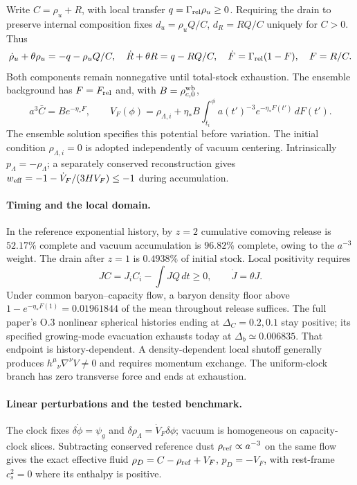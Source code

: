 \documentclass[11pt]{article}
\begin{document}
Write $C=\rho_u+R$, with local transfer $q=\Gamma_{\rm rel}\rho_u\ge0$. Requiring the drain to preserve internal composition fixes $d_u=\rho_uQ/C$, $d_R=RQ/C$ uniquely for $C>0$. Thus
\[
\dot\rho_u+\theta\rho_u=-q-\rho_uQ/C,\quad
\dot R+\theta R=q-RQ/C,\quad
\dot F=\Gamma_{\rm rel}(1-F),\quad F=R/C.
\]
Both components remain nonnegative until total-stock exhaustion. The ensemble background has $F=F_{\rm rel}$ and, with $B=\rho_{c,0}^{\rm wb}$,
\[
\boxed{a^3\bar C=B e^{-\eta_*F},\qquad
V_F(\phi)=\rho_{\Lambda,i}+\eta_*B\int_{t_i}^{\phi}a(t')^{-3}e^{-\eta_*F(t')}\,dF(t').}
\]
The ensemble solution specifies this potential before variation. The initial condition $\rho_{\Lambda,i}=0$ is adopted independently of vacuum centering. Intrinsically $p_\Lambda=-\rho_\Lambda$; a separately conserved reconstruction gives $w_{\rm eff}=-1-\dot V_F/(3HV_F)\le-1$ during accumulation.

\paragraph{Timing and the local domain.}
In the reference exponential history, by $z=2$ cumulative comoving release is $52.17\%$ complete and vacuum accumulation is $96.82\%$ complete, owing to the $a^{-3}$ weight. The drain after $z=1$ is $0.4938\%$ of initial stock. Local positivity requires
\[
JC=J_iC_i-\int JQ\,dt\ge0,\qquad \dot J=\theta J.
\]
Under common baryon--capacity flow, a baryon density floor above $1-e^{-\eta_*F(1)}=0.01961844$ of the mean throughout release suffices. The full paper's O.3 nonlinear spherical histories ending at $\Delta_C=0.2,0.1$ stay positive; its specified growing-mode evacuation exhausts today at $\Delta_b\simeq0.006835$. That endpoint is history-dependent. A density-dependent local shutoff generally produces $h^\mu{}_{\nu}\nabla^\nu V\ne0$ and requires momentum exchange. The uniform-clock branch has zero transverse force and ends at exhaustion.

\paragraph{Linear perturbations and the tested benchmark.}
The clock fixes $\delta\dot\phi=\psi_g$ and $\delta\rho_\Lambda=\dot V_F\delta\phi$; vacuum is homogeneous on capacity-clock slices. Subtracting conserved reference dust $\rho_{\rm ref}\propto a^{-3}$ on the same flow gives the exact effective fluid $\rho_D=C-\rho_{\rm ref}+V_F$, $p_D=-V_F$, with rest-frame $c_s^2=0$ where its enthalpy is positive.
\end{document}
